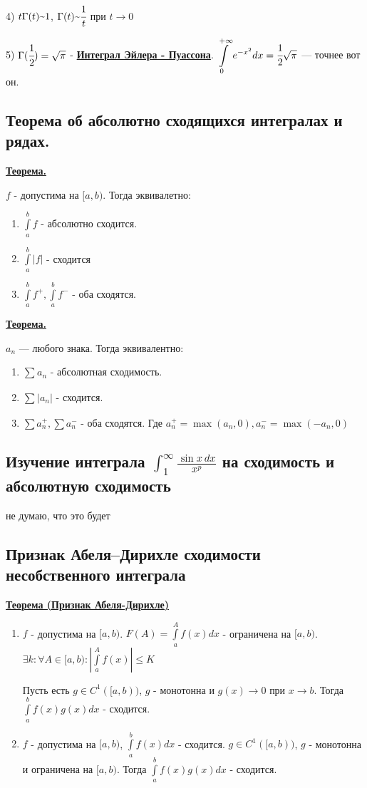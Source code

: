 \documentclass{article}
\newcommand{\integral}[2]{\displaystyle\int\limits_{#1}^{#2}}
\newcommand{\deff}[1]{\underline{\textbf{#1}}}
\newcommand{\thmm}[1]{\underline{\textbf{#1}}}
\newcommand{\mytilde}{\raisebox{0.5ex}{\texttildelow}}
\begin{document}
4) $t \Gamma(t) \mytilde 1$, $\Gamma(t) \mytilde \cfrac{1}{t}$ при $t\rightarrow 0 $

5) $\Gamma(\cfrac{1}{2}) = \sqrt{\pi}$ - \deff{Интеграл Эйлера - Пуассона}. $\integral{0}{+\infty}e^{-x^2}dx = \cfrac{1}{2}\sqrt{\pi}$ --- точнее вот он.

\subsection{Теорема об абсолютно сходящихся интегралах и рядах.}

\thmm{Теорема.}

$f$ - допустима на $[a,b)$. Тогда эквивалетно:

\begin{enumerate}
    \item $\integral{a}{b}f$ - абсолютно сходится.
    \item $\integral{a}{b}|f|$ - сходится
    \item $\integral{a}{b} f^+, \integral{a}{b} f^{-}$ - оба сходятся.
\end{enumerate}


\thmm{Теорема.}

$a_n$ --- любого знака. Тогда эквивалентно:
\begin{enumerate}
    \item $\sum\limits_{}a_n$ - абсолютная сходимость.
    \item $\sum\limits_{}|a_n|$ - сходится.
    \item $\sum a_n^+, \sum a_n^-$ - оба сходятся. Где $a_n^+ = \max(a_n,0), a^-_n= \max(-a_n,0)$
\end{enumerate}

\subsection{Изучение интеграла $\int_1^{\infty} \frac{\sin x\,dx}{x^p}$ на сходимость и абсолютную сходимость}

не думаю, что это будет

\subsection{Признак Абеля--Дирихле сходимости несобственного интеграла}

\thmm{Теорема (Признак Абеля-Дирихле)}

\begin{enumerate}
    \item $f$ - допустима на $[a,b)$. $F(A) = \integral{a}{A}f(x)dx$ - ограничена на $[a,b)$. $\exists k: \forall A \in [a,b): |\integral{a}{A}f(x)|\leq K$
    
    Пусть есть $g\in C^1([a,b))$, $g$ - монотонна и $g(x)\rightarrow 0$ при $x\rightarrow b$. Тогда $\integral{a}{b} f(x) g(x)dx$ - сходится.
    \item $f$ - допустима на $[a,b)$, $\integral{a}{b}f(x)dx$ - сходится. $g \in C^1([a,b))$, $g$ - монотонна и ограничена на $[a,b)$. Тогда $\integral{a}{b} f(x) g(x)dx$ - сходится.
\end{enumerate}
\end{document}
